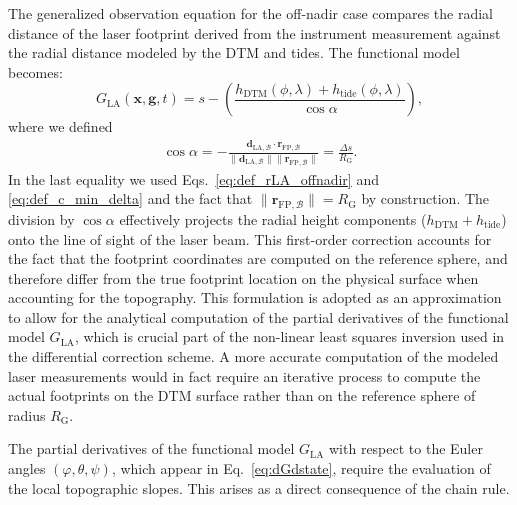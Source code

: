 \documentclass[lineno, pdflatex,sn-mathphys-ay]{sn-jnl}
\theoremstyle{thmstyleone}%
\theoremstyle{thmstyletwo}%
\theoremstyle{thmstylethree}%
\renewcommand{\vec}[1]{\boldsymbol{#1}}
\begin{document}
The generalized observation equation for the off-nadir case compares the radial distance of the laser footprint derived from the instrument measurement against the radial distance modeled by the DTM and tides. The functional model becomes:
%
\begin{equation}
    {G}_{\mathrm{LA}}(\vec{x},\vec{g},t) = s -
    \left( \frac{ h_{\mathrm{DTM}}(\phi, \lambda) 
	+  h_{\mathrm{tide}}(\phi, \lambda)}{\cos \alpha }\right),
    \label{eq:g_LA_offnadir}
\end{equation}
where we defined
%
\begin{align}
	\cos \alpha = -
	\frac{\vec{d}_{\mathrm{LA},\mathcal{B}} \cdot \vec{r}_{\mathrm{FP},\mathcal{B}}}{\|\vec{d}_{\mathrm{LA},\mathcal{B}} \| \| \vec{r}_{\mathrm{FP},\mathcal{B}}\|}
	=
	\frac{\Delta s}{R_{\mathrm{G}}}.
\end{align}
%
In the last equality we used Eqs.~\eqref{eq:def_rLA_offnadir} and \eqref{eq:def_c_min_delta} and the fact that ${\| \vec{r}_{\mathrm{FP},\mathcal{B}}\| = R_{\mathrm{G}} }$ by construction.
The division by $\cos \alpha$ effectively projects the radial height components ($h_{\mathrm{DTM}} + h_{\mathrm{tide}}$) onto the line of sight of the laser beam.
%
This first-order correction accounts for the fact that the footprint coordinates are computed on the reference sphere, and therefore differ from the true footprint location on the physical surface when accounting for the topography.
%
This formulation is adopted as an approximation to allow for the analytical computation of the partial derivatives of the functional model ${G}_{\mathrm{LA}}$, which is crucial part of the non-linear least squares inversion used in the differential correction scheme.
A more accurate computation of the modeled laser measurements would in fact require an iterative process to compute the actual footprints on the DTM surface rather than on the reference sphere of radius $R_{\mathrm{G}}$.




The partial derivatives of the functional model ${G}_{\mathrm{LA}}$ with respect to the Euler angles $
(\varphi, \theta, \psi )$, which appear in Eq.~\ref{eq:dGdstate}, require the evaluation of the local topographic slopes. This arises as a direct consequence of the chain rule.
% 
\end{document}

